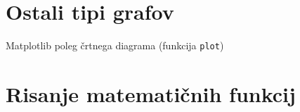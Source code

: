 \section{Ostali tipi grafov}

Matplotlib poleg črtnega diagrama (funkcija \texttt{plot})

\section{Risanje matematičnih funkcij}
